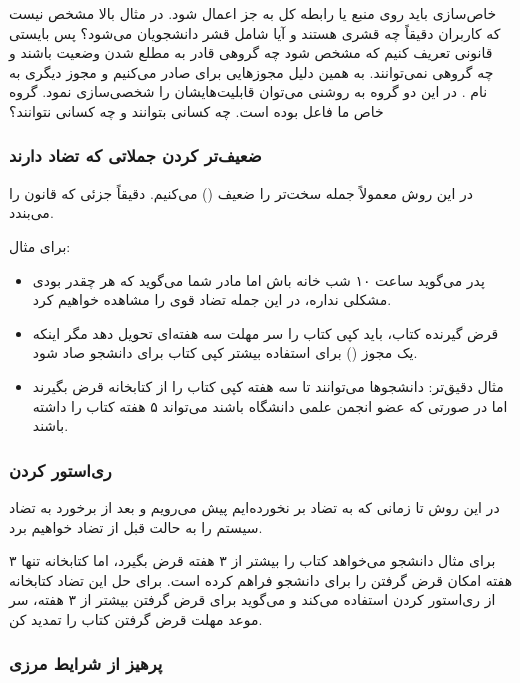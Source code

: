 خاص‌سازی باید روی منبع یا رابطه کل به جز اعمال شود. در مثال بالا مشخص نیست که
کاربران دقیقاً چه قشری هستند و آیا شامل قشر دانشجویان می‌شود؟ پس بایستی قانونی
تعریف کنیم که مشخص شود چه گروهی قادر به مطلع شدن وضعیت باشند و چه گروهی
نمی‌توانند. به همین دلیل مجوز‌هایی برای  صادر می‌کنیم و مجوز
دیگری به نام . در این دو گروه به روشنی می‌توان قابلیت‌هایشان را
شخصی‌سازی نمود. گروه خاص ما فاعل بوده است. چه کسانی بتوانند و چه کسانی نتوانند؟

\subsubsection{ضعیف‌تر کردن جملاتی که تضاد دارند}

در این روش معمولاً جمله سخت‌تر را ضعیف () می‌کنیم. دقیقاً جزئی که قانون
را می‌بندد.

برای مثال:

\begin{itemize}
    \item پدر می‌گوید ساعت ۱۰ شب خانه باش اما مادر شما می‌گوید که هر چقدر بودی
    مشکلی نداره، در این جمله تضاد قوی را مشاهده خواهیم کرد.
    \item قرض گیرنده کتاب، باید کپی کتاب را سر مهلت سه هفته‌ای تحویل دهد مگر
    اینکه یک مجوز () برای استفاده بیشتر کپی کتاب برای دانشجو صاد
    شود.
    \item مثال دقیق‌تر: دانشجو‌ها می‌توانند تا سه هفته کپی کتاب را از کتابخانه
    قرض بگیرند اما در صورتی که عضو انجمن علمی دانشگاه باشند می‌تواند ۵ هفته کتاب
    را داشته باشند.
\end{itemize}

\subsubsection{ری‌استور کردن}

در این روش تا زمانی که به تضاد بر نخورده‌ایم پیش می‌رویم و بعد از برخورد به تضاد
سیستم را به حالت قبل از تضاد خواهیم برد.

برای مثال دانشجو می‌خواهد کتاب را بیشتر از ۳ هفته قرض بگیرد، اما کتابخانه تنها ۳
هفته امکان قرض گرفتن را برای دانشجو فراهم کرده است. برای حل این تضاد کتابخانه از
ری‌استور کردن استفاده می‌کند و می‌گوید برای قرض گرفتن بیشتر از ۳ هفته، سر موعد
مهلت قرض گرفتن کتاب را تمدید کن.

\subsubsection{پرهیز از شرایط مرزی}

